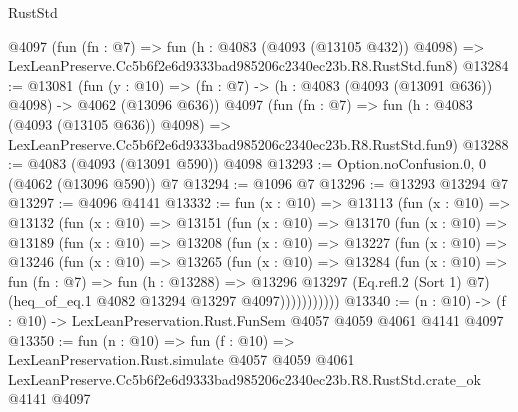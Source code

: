 \begin{lexlean}{RustStd}
\begin{coremodule}
    @4097
    (fun (fn : @7) =>
    fun (h : @4083 (@4093 (@13105 @432)) @4098) =>
    LexLeanPreserve.Cc5b6f2e6d9333bad985206c2340ec23b.R8.RustStd.fun8)
@13284 := @13081
    (fun (y : @10) => (fn : @7) -> (h : @4083 (@4093 (@13091 @636)) @4098) -> @4062 (@13096 @636))
    @4097
    (fun (fn : @7) =>
    fun (h : @4083 (@4093 (@13105 @636)) @4098) =>
    LexLeanPreserve.Cc5b6f2e6d9333bad985206c2340ec23b.R8.RustStd.fun9)
@13288 := @4083 (@4093 (@13091 @590)) @4098
@13293 := Option.noConfusion.{0, 0} (@4062 (@13096 @590)) @7
@13294 := @1096 @7
@13296 := @13293 @13294 @7
@13297 := @4096 @4141
@13332 := fun (x : @10) =>
  @13113
    (fun (x : @10) =>
    @13132
      (fun (x : @10) =>
      @13151
        (fun (x : @10) =>
        @13170
          (fun (x : @10) =>
          @13189
            (fun (x : @10) =>
            @13208
              (fun (x : @10) =>
              @13227
                (fun (x : @10) =>
                @13246
                  (fun (x : @10) =>
                  @13265
                    (fun (x : @10) =>
                    @13284
                      (fun (x : @10) =>
                      fun (fn : @7) =>
                      fun (h : @13288) =>
                      @13296
                        @13297
                        (Eq.refl.{2} (Sort 1) @7)
                        (heq_of_eq.{1} @4082 @13294 @13297 @4097)))))))))))
@13340 := (n : @10) -> (f : @10) -> LexLeanPreservation.Rust.FunSem @4057 @4059 @4061 @4141 @4097
@13350 := fun (n : @10) =>
  fun (f : @10) =>
  LexLeanPreservation.Rust.simulate
    @4057
    @4059
    @4061
    LexLeanPreserve.Cc5b6f2e6d9333bad985206c2340ec23b.R8.RustStd.crate_ok
    @4141
    @4097
\end{coremodule}
\end{lexlean}
